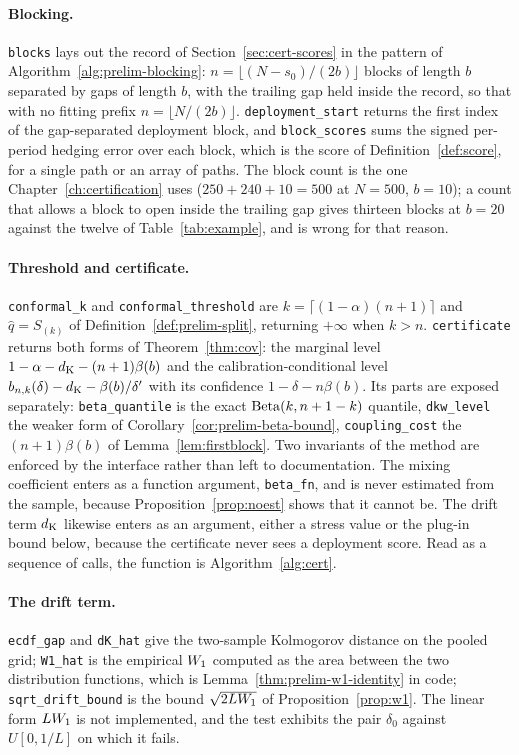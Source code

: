 \paragraph{Blocking.}
\texttt{blocks} lays out the record of Section~\ref{sec:cert-scores} in the pattern of Algorithm~\ref{alg:prelim-blocking}: $n=\lfloor(N-s_0)/(2b)\rfloor$ blocks of length $b$ separated by gaps of length $b$, with the trailing gap held inside the record, so that with no fitting prefix $n=\lfloor N/(2b)\rfloor$. \texttt{deployment\_start} returns the first index of the gap-separated deployment block, and \texttt{block\_scores} sums the signed per-period hedging error over each block, which is the score of Definition~\ref{def:score}, for a single path or an array of paths. The block count is the one Chapter~\ref{ch:certification} uses ($250+240+10=500$ at $N=500$, $b=10$); a count that allows a block to open inside the trailing gap gives thirteen blocks at $b=20$ against the twelve of Table~\ref{tab:example}, and is wrong for that reason.

\paragraph{Threshold and certificate.}
\texttt{conformal\_k} and \texttt{conformal\_threshold} are $k=\lceil(1-\alpha)(n+1)\rceil$ and $\hat q=S_{(k)}$ of Definition~\ref{def:prelim-split}, returning $+\infty$ when $k>n$. \texttt{certificate} returns both forms of Theorem~\ref{thm:cov}: the marginal level $1-\alpha-d_{\mathrm{K}}-(n+1)\beta(b)$ and the calibration-conditional level $b_{n,k}(\delta)-d_{\mathrm{K}}-\beta(b)/\delta'$ with its confidence $1-\delta-n\beta(b)$. Its parts are exposed separately: \texttt{beta\_quantile} is the exact $\operatorname{Beta}(k,n+1-k)$ quantile, \texttt{dkw\_level} the weaker form of Corollary~\ref{cor:prelim-beta-bound}, \texttt{coupling\_cost} the $(n+1)\beta(b)$ of Lemma~\ref{lem:firstblock}. Two invariants of the method are enforced by the interface rather than left to documentation. The mixing coefficient enters as a function argument, \texttt{beta\_fn}, and is never estimated from the sample, because Proposition~\ref{prop:noest} shows that it cannot be. The drift term $d_{\mathrm{K}}$ likewise enters as an argument, either a stress value or the plug-in bound below, because the certificate never sees a deployment score. Read as a sequence of calls, the function is Algorithm~\ref{alg:cert}.

\paragraph{The drift term.}
\texttt{ecdf\_gap} and \texttt{dK\_hat} give the two-sample Kolmogorov distance on the pooled grid; \texttt{W1\_hat} is the empirical $W_1$ computed as the area between the two distribution functions, which is Lemma~\ref{thm:prelim-w1-identity} in code; \texttt{sqrt\_drift\_bound} is the bound $\sqrt{2LW_1}$ of Proposition~\ref{prop:w1}. The linear form $LW_1$ is not implemented, and the test exhibits the pair $\delta_0$ against $U[0,1/L]$ on which it fails.

